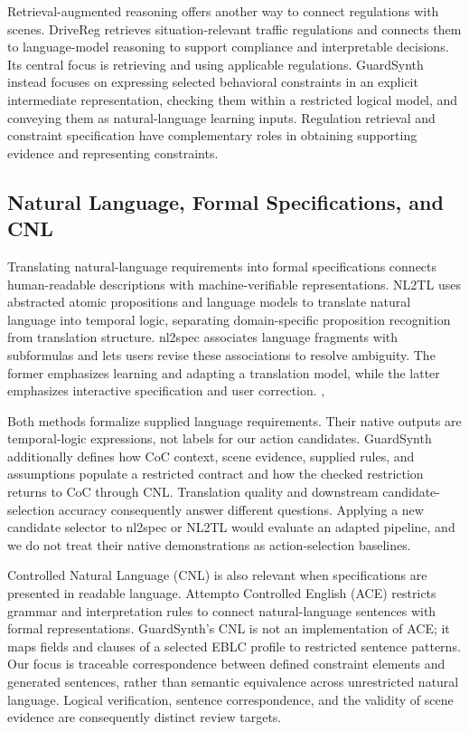 \documentclass[nolineno]{ieeeaccess}
\begin{document}
Retrieval-augmented reasoning offers another way to connect regulations with scenes. DriveReg retrieves situation-relevant traffic regulations and connects them to language-model reasoning to support compliance and interpretable decisions. Its central focus is retrieving and using applicable regulations. GuardSynth instead focuses on expressing selected behavioral constraints in an explicit intermediate representation, checking them within a restricted logical model, and conveying them as natural-language learning inputs. Regulation retrieval and constraint specification have complementary roles in obtaining supporting evidence and representing constraints. \cite{r7}\par

\subsection{Natural Language, Formal Specifications, and CNL}

Translating natural-language requirements into formal specifications connects human-readable descriptions with machine-verifiable representations. NL2TL uses abstracted atomic propositions and language models to translate natural language into temporal logic, separating domain-specific proposition recognition from translation structure. nl2spec associates language fragments with subformulas and lets users revise these associations to resolve ambiguity. The former emphasizes learning and adapting a translation model, while the latter emphasizes interactive specification and user correction. \cite{r8}, \cite{r9}\par

Both methods formalize supplied language requirements. Their native outputs are temporal-logic expressions, not labels for our action candidates. GuardSynth additionally defines how CoC context, scene evidence, supplied rules, and assumptions populate a restricted contract and how the checked restriction returns to CoC through CNL. Translation quality and downstream candidate-selection accuracy consequently answer different questions. Applying a new candidate selector to nl2spec or NL2TL would evaluate an adapted pipeline, and we do not treat their native demonstrations as action-selection baselines. \cite{r8,r9}\par

Controlled Natural Language (CNL) is also relevant when specifications are presented in readable language. Attempto Controlled English (ACE) restricts grammar and interpretation rules to connect natural-language sentences with formal representations. GuardSynth's CNL is not an implementation of ACE; it maps fields and clauses of a selected EBLC profile to restricted sentence patterns. Our focus is traceable correspondence between defined constraint elements and generated sentences, rather than semantic equivalence across unrestricted natural language. Logical verification, sentence correspondence, and the validity of scene evidence are consequently distinct review targets. \cite{r10}\par
\end{document}
